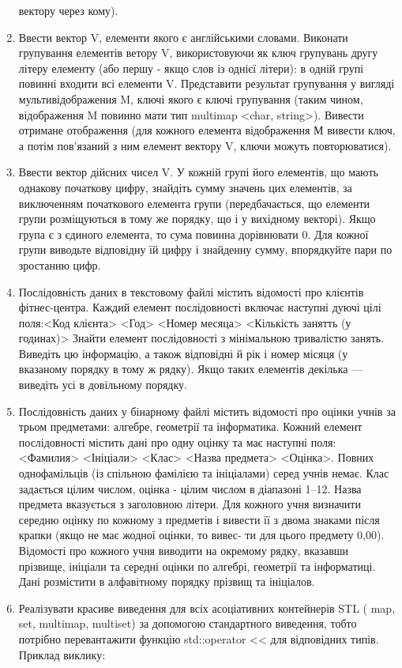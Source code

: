 \documentclass[]{article}
\begin{document}
\begin{enumerate}
  вектору через кому).
\item
  Ввести вектор V, елементи якого є англійськими словами. Виконати
  групування елементів ветору V, використовуючи як ключ групувань другу
  літеру елементу (або першу - якщо слов із однієї літери): в одній
  групі повинні входити всі елементи V. Представити результат групування
  у вигляді мультивідображення M, ключі якого є ключі групування (таким
  чином, відображення M повинно мати тип multimap \textless{}char,
  string\textgreater{}). Вивести отримане отображення (для кожного
  елемента відображення М вивести ключ, а потім пов'язаний з ним елемент
  вектору V, ключи можуть повторюватися).
\item
  Ввести вектор дійсних чисел V. У кожній групі його елементів, що мають
  однакову початкову цифру, знайдіть сумму значень цих елементів, за
  виключенням початкового елемента групи (передбачається, що елементи
  групи розміщуються в тому же порядку, що і у вихідному векторі). Якщо
  група є з єдиного елемента, то сума повинна дорівнювати 0. Для кожної
  групи виводьте відповідну їй цифру і знайденну сумму, впорядкуйте пари
  по зростанню цифр.
\item
  Послідовність даних в текстовому файлі містить відомості про клієнтів
  фітнес-центра. Каждий елемент послідовності включає наступні дуючі
  цілі поля:\textless{}Код клієнта\textgreater{}
  \textless{}Год\textgreater{} \textless{}Номер месяца\textgreater{}
  \textless{}Кількість занятть (у годинах)\textgreater{} Знайти елемент
  послідовності з мінімальною тривалістю занять. Виведіть цю інформацію,
  а також відповідні й рік і номер місяця (у вказаному порядку в тому ж
  рядку). Якщо таких елементів декілька --- виведіть усі в довільному
  порядку.
\item
  Послідовність даних у бінарному файлі містить відомості про оцінки
  учнів за трьом предметами: алгебре, геометрії та інформатика. Кожний
  елемент послідовності містить дані про одну оцінку та має наступні
  поля: \textless{}Фамилия\textgreater{}
  \textless{}Ініціали\textgreater{} \textless{}Клас\textgreater{}
  \textless{}Назва предмета\textgreater{}
  \textless{}Оцінка\textgreater{}. Повних однофамільців (із спільною
  фамілією та ініціалами) серед учнів немає. Клас задається цілим
  числом, оцінка - цілим числом в діапазоні 1--12. Назва предмета
  вказується з заголовною літери. Для кожного учня визначити середню
  оцінку по кожному з предметів і вивести її з двома знаками після
  крапки (якщо не має жодної оцінки, то вивес- ти для цього предмету
  0,00). Відомості про кожного учня виводити на окремому рядку, вказавши
  прізвище, ініціали та середні оцінки по алгебрі, геометрії та
  інформатиці. Дані розмістити в алфавітному порядку прізвищ та
  ініціалов.
\item
  Реалізувати красиве виведення для всіх асоціативних контейнерів STL (
  map, set, multimap, multiset) за допомогою стандартного виведення,
  тобто потрібно перевантажити функцію std::operator
  \textless{}\textless{} для відповідних типів. Приклад виклику:
\end{enumerate}
\end{document}
